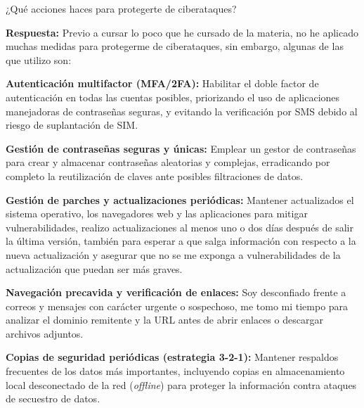 ¿Qué acciones haces para protegerte de ciberataques?

\textbf{Respuesta:}
Previo a cursar lo poco que he cursado de la materia, no he aplicado muchas medidas para protegerme de ciberataques, sin embargo, algunas de las que utilizo son:

\begin{itemizeColor}
    \item \textbf{Autenticación multifactor (MFA/2FA):} Habilitar el doble factor de autenticación en todas las cuentas posibles, priorizando el uso de aplicaciones manejadoras de contraseñas seguras, y evitando la verificación por SMS debido al riesgo de suplantación de SIM.
    \item \textbf{Gestión de contraseñas seguras y únicas:} Emplear un gestor de contraseñas para crear y almacenar contraseñas aleatorias y complejas, erradicando por completo la reutilización de claves ante posibles filtraciones de datos.
    \item \textbf{Gestión de parches y actualizaciones periódicas:} Mantener actualizados el sistema operativo, los navegadores web y las aplicaciones para mitigar vulnerabilidades, realizo actualizaciones al menos uno o dos días después de salir la última versión, también para esperar a que salga información con respecto a la nueva actualización y asegurar que no se me exponga a vulnerabilidades de la actualización que puedan ser más graves.
    \item \textbf{Navegación precavida y verificación de enlaces:} Soy desconfiado frente a correos y mensajes con carácter urgente o sospechoso, me tomo mi tiempo para analizar el dominio remitente y la URL antes de abrir enlaces o descargar archivos adjuntos.
    \item \textbf{Copias de seguridad periódicas (estrategia 3-2-1):} Mantener respaldos frecuentes de los datos más importantes, incluyendo copias en almacenamiento local desconectado de la red (\textit{offline}) para proteger la información contra ataques de secuestro de datos.
\end{itemizeColor}

